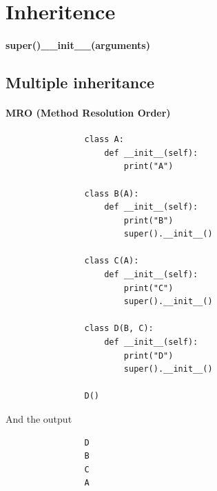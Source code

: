 \section{Inheritence}
    \paragraph{super()\_\_init\_\_(arguments)}
    \subsection{Multiple inheritance}
        \paragraph{MRO (Method Resolution Order)}
            \begin{verbatim}
                class A:
                    def __init__(self):
                        print("A")
                
                class B(A):
                    def __init__(self):
                        print("B")
                        super().__init__()
                
                class C(A):
                    def __init__(self):
                        print("C")
                        super().__init__()
                
                class D(B, C):
                    def __init__(self):
                        print("D")
                        super().__init__()
                
                D()
            \end{verbatim}
            And the output
            \begin{verbatim}
                D
                B
                C
                A
            \end{verbatim}